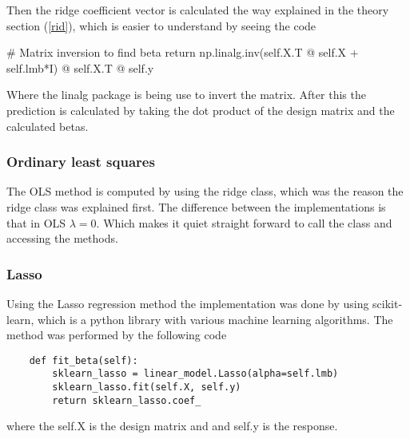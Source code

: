 \documentclass[../main.tex]{subfiles}
\begin{document}
Then the ridge coefficient vector is calculated the way explained in the theory section (\ref{rid}), which is easier to understand by seeing the code
\begin{python}
        # Matrix inversion to find beta
        return np.linalg.inv(self.X.T @ self.X + self.lmb*I) @ self.X.T @ self.y
\end{python}
Where the linalg package is being use to invert the matrix. After this the prediction is calculated by taking the dot product of the design matrix and the calculated betas.

\subsubsection{Ordinary least squares}
The OLS method is computed by using the ridge class, which was the reason the ridge class was explained first. The difference between the implementations is that in OLS $\lambda=0$. Which makes it quiet straight forward to call the class and accessing the methods.

\subsubsection{Lasso}
Using the Lasso regression method the implementation was done by using scikit-learn, which is a python library with various machine learning algorithms. The method was performed by the following code
\begin{verbatim}
    def fit_beta(self):
        sklearn_lasso = linear_model.Lasso(alpha=self.lmb)
        sklearn_lasso.fit(self.X, self.y)
        return sklearn_lasso.coef_
\end{verbatim}
where the self.X is the design matrix and and self.y is the response.
\end{document}
